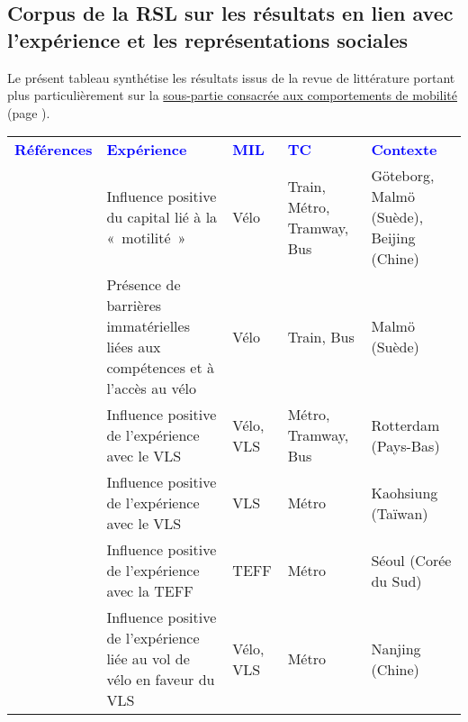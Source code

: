     \newpage
\subsection{Corpus de la \acrshort{RSL} sur les résultats en lien avec l'expérience et les représentations sociales}
    \label{donnees-ouvertes:rsl_resultats_experience_mobilite}
    
Le présent tableau synthétise les résultats issus de la revue de littérature portant plus particulièrement sur la \hyperref[Comportements de mobilité]{sous-partie consacrée aux comportements de mobilité} (page \pageref{Comportements de mobilité}).\par

        \begin{longtable}{p{3cm}p{4cm}p{1.5cm}p{1.8cm}p{2.3cm}}
        \hline
        \textcolor{blue}{\textbf{Références}} & \textcolor{blue}{\textbf{Expérience}} & \textcolor{blue}{\textbf{MIL}} & \textcolor{blue}{\textbf{TC}} & \textcolor{blue}{\textbf{Contexte}}
        \hline
        \endhead
\multicolumn{5}{l}{\textbf{Influence positive de l'expérience antérieure de mobilité}}\\
    \small{\textcite{hamidi_shaping_2020}}\index{Hamidi, Zahra|pagebf} & \small{Influence positive du capital lié à la «~motilité~»} & \small{Vélo} & \small{Train, Métro, Tramway, Bus} & \small{Göteborg, Malmö (Suède), Beijing (Chine)}\\
    \small{\textcite{hamidi_inequalities_2019}}\index{Hamidi, Zahra|pagebf} & \small{Présence de barrières immatérielles liées aux compétences et à l'accès au vélo} & \small{Vélo} & \small{Train, Bus} & \small{Malmö (Suède)}\\
    \small{\textcite{montes_shared_2023}}\index{Montes, Alejandro|pagebf} & \small{Influence positive de l'expérience avec le VLS} & \small{Vélo, VLS} & \small{Métro, Tramway, Bus} & \small{Rotterdam (Pays-Bas)}\\
    \small{\textcite{cheng_expanding_2018}}\index{Cheng, Yung-Hsiang|pagebf} & \small{Influence positive de l'expérience avec le VLS} & \small{VLS} & \small{Métro} & \small{Kaohsiung (Taïwan)}\\
    \small{\textcite{baek_electric_2021}}\index{Baek, Kwangho|pagebf} & \small{Influence positive de l'expérience avec la TEFF} & \small{TEFF} & \small{Métro} & \small{Séoul (Corée du Sud)}\\
    \small{\textcite{ji_public_2017}}\index{Ji, Yanjie|pagebf} & \small{Influence positive de l'expérience liée au vol de vélo en faveur du VLS} & \small{Vélo, VLS} & \small{Métro} & \small{Nanjing (Chine)}\\

\end{longtable}
